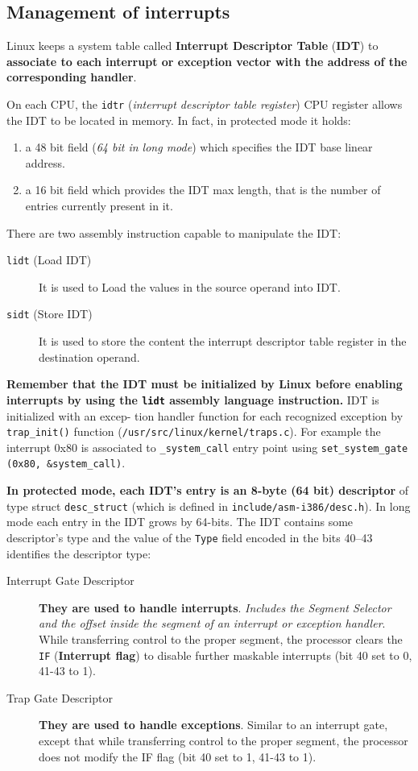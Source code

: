 \documentclass[10pt,a4paper]{article}
\begin{document}
\subsection{Management of interrupts}

Linux keeps a system table called \textbf{Interrupt Descriptor Table} (\textbf{IDT}) to \textbf{associate to each interrupt or exception vector with the address of the corresponding handler}. 

On each CPU, the \texttt{idtr} (\textit{interrupt descriptor table register}) CPU register allows the IDT to be located in memory. In fact, in protected mode it holds:
\begin{enumerate}
\item a 48 bit field (\textit{64 bit in long mode}) which specifies the IDT base linear address.
\item a 16 bit field which provides the IDT max length, that is the number of entries currently present in it. 
\end{enumerate}

There are two assembly instruction capable to manipulate the IDT:
\begin{description}
\item[\texttt{lidt} (Load IDT)] It is used to Load the values in the source operand into IDT. 
\item[\texttt{sidt} (Store IDT)] It is used to store the content the interrupt descriptor table register in the destination operand.
\end{description}

\textbf{Remember that the IDT must be initialized by Linux before enabling interrupts by using the \texttt{lidt} assembly language instruction.} IDT is initialized with an excep-
tion handler function for each recognized exception by \texttt{trap\_init()} function (\texttt{/usr/src/linux/kernel/traps.c}). For example the interrupt 0x80 is associated to \texttt{\_system\_call} entry point using \texttt{set\_system\_gate (0x80, \&system\_call)}.


\textbf{In protected mode, each IDT's entry is an 8-byte (64 bit) descriptor} of type struct \texttt{desc\_struct} (which is defined in \texttt{include/asm-i386/desc.h}). In long mode each entry in the IDT grows by 64-bits. The IDT contains some descriptor's type and the value of the \texttt{Type} field encoded in the bits 40–43 identifies the descriptor type:
\begin{description}
\item[Interrupt Gate Descriptor] \textbf{They are used to handle interrupts}. \textit{Includes the Segment Selector and the offset inside the segment of an interrupt
or exception handler}. While transferring control to the proper segment, the processor clears the \texttt{IF} (\textbf{Interrupt flag}) to disable further maskable interrupts (bit 40 set to 0, 41-43 to 1). 
\item[Trap Gate Descriptor] \textbf{They are used to handle exceptions}. Similar to an interrupt gate, except that while transferring control to the proper
segment, the processor does not modify the IF flag (bit 40 set to 1, 41-43 to 1).
\end{description}
\end{document}
